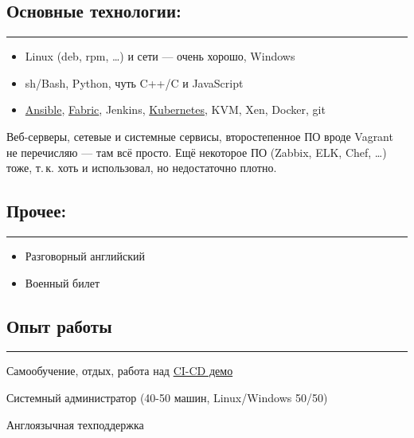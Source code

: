 \documentclass[10pt, a4paper]{article}
\newcommand{\Delimitline}{
  \vspace{-4ex}
  \textcolor[RGB]{120,120,120}{\rule{\linewidth}{1pt}}
  \vspace{-4ex}
}
\begin{document}
\subsection*{Основные технологии:}
\Delimitline
\begin{itemize}
  \item Linux (deb, rpm, \dots) и сети — очень хорошо, Windows
  \item sh/Bash, Python, чуть C++/C и JavaScript
  \item \href{https://github.com/bititanb/ansible-taskmngr}{Ansible}, \href{https://bitbucket.org/bititanb/ivd-fabric/src}{Fabric}, Jenkins, \href{https://github.com/bititanb/ansible-taskmngr/tree/master/roles/taskmngr-kubernetes/templates}{Kubernetes}, KVM, Xen, Docker, git\par
\end{itemize}

Веб-серверы, сетевые и системные сервисы, второстепенное ПО вроде Vagrant не перечисляю — там всё просто. Ещё некоторое ПО (Zabbix, ELK, Chef, \dots) тоже, т.\,к. хоть и использовал, но недостаточно плотно.

\subsection*{Прочее:}
\Delimitline
\begin{itemize}
  \item Разговорный английский
  \item Военный билет
\end{itemize}

\subsection*{Опыт работы}
\Delimitline
\begin{etaremune}
  \item Самообучение, отдых, работа над \href{https://github.com/bititanb/CI-CD-pipeline}{CI-CD демо}
  \item Системный администратор (40-50 машин, Linux/Windows 50/50)
  \item Англоязычная техподдержка
\end{etaremune}
\end{document}
